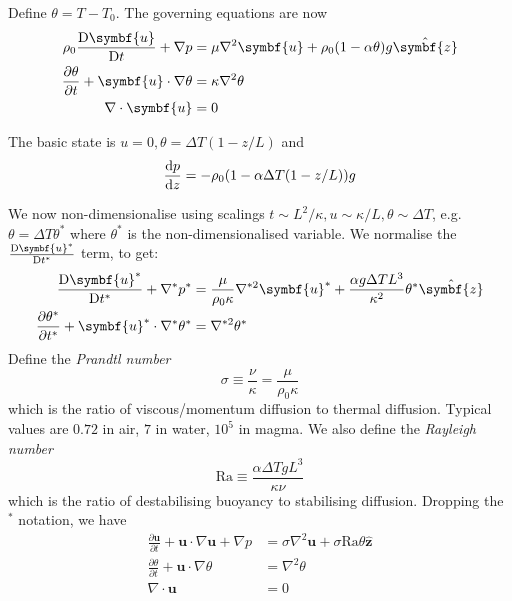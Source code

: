 \documentclass{jknotes}
\renewcommand{\u}{\symbf{u}}
\begin{document}
Define $\theta = T - T_0$. The governing equations are now
\begin{align}
	\rho_0 \frac{\diffD \u}{\diffD t} + \nabla p &= \mu \nabla^2 \u +
	\rho_0(1-\alpha \theta)g \hat{\symbf{z}} \\
	\frac{\partial \theta}{\partial t} + \u \cdot \nabla \theta &= \kappa
	\nabla^2 \theta \\
	\nabla \cdot \u &= 0
\end{align}

The basic state is $u = 0, \theta = \Delta T (1-z/L)$ and
\begin{equation}
	\frac{\diffd p}{\diffd z} = -\rho_0 (1-\alpha \Delta T(1-z/L))g
\end{equation}

We now non-dimensionalise using scalings $t \sim L^2/\kappa, u \sim \kappa/L,
\theta \sim \Delta T$, e.g. $\theta = \Delta T \theta^*$ where $\theta^*$ is
the non-dimensionalised variable. We normalise the $\frac{\diffD \u^*}{\diffD
t^*}$ term, to get:
\begin{align}
	\frac{\diffD \u^*}{\diffD t^*} + \nabla^* p^* &= \frac{\mu}{\rho_0 \kappa}
	\nabla^{*2} \u^* + \frac{\alpha g \Delta T L^3}{\kappa^2} \theta^* \hat{\symbf{z}} \\
	\frac{\partial \theta^*}{\partial t^*} + \u^* \cdot \nabla^* \theta^* &=
	\nabla^{*2} \theta^* \\
\end{align}
Define the \emph{Prandtl number} 
\begin{equation}
	\sigma \equiv \frac{\nu}{\kappa} = \frac{\mu}{\rho_0 \kappa}
\end{equation}
which is the ratio of viscous/momentum diffusion to thermal diffusion. Typical values
are $0.72$ in air, $7$ in water, $10^5$ in magma. We also define the
\emph{Rayleigh number}
\begin{equation}
	\text{Ra} \equiv \frac{\alpha \Delta T g L^3}{\kappa \nu}
\end{equation}
which is the ratio of destabilising buoyancy to stabilising diffusion.
Dropping the $^*$ notation, we have
\begin{align}
	\frac{\partial \u}{\partial t} + \u \cdot \nabla \u + \nabla p &= \sigma
	\nabla^2 \u + \sigma \text{Ra} \theta \hat{\symbf{z}} \\
	\frac{\partial \theta}{\partial t} + \u \cdot \nabla \theta &= \nabla^2
	\theta \\
	\nabla \cdot \u &= 0
\end{align}
\end{document}
